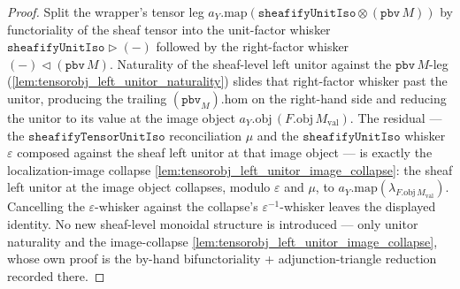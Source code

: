 \begin{proof}
  \leanok
  Split the wrapper's tensor leg \(a_Y.\mathrm{map}(\mathtt{sheafifyUnitIso} \otimes (\mathtt{pbv}\,M))\)
  by functoriality of the sheaf tensor into the unit-factor whisker
  \(\mathtt{sheafifyUnitIso} \rhd (-)\) followed by the right-factor whisker
  \((-) \lhd (\mathtt{pbv}\,M)\). Naturality of the sheaf-level left unitor against the
  \(\mathtt{pbv}\,M\)-leg (\cref{lem:tensorobj_left_unitor_naturality}) slides that right-factor whisker
  past the unitor, producing the trailing \((\mathtt{pbv}_{M}).\mathrm{hom}\) on the right-hand side and
  reducing the unitor to its value at the image object
  \(a_Y.\mathrm{obj}\,(F.\mathrm{obj}\,M_{\mathrm{val}})\). The residual --- the
  \(\mathtt{sheafifyTensorUnitIso}\) reconciliation \(\mu\) and the \(\mathtt{sheafifyUnitIso}\)
  whisker \(\varepsilon\) composed against the sheaf left unitor at that image object --- is exactly the
  localization-image collapse \cref{lem:tensorobj_left_unitor_image_collapse}: the sheaf left unitor at
  the image object collapses, modulo \(\varepsilon\) and \(\mu\), to
  \(a_Y.\mathrm{map}(\lambda_{F.\mathrm{obj}\,M_{\mathrm{val}}})\). Cancelling the
  \(\varepsilon\)-whisker against the collapse's \(\varepsilon^{-1}\)-whisker leaves the displayed
  identity. No new sheaf-level monoidal structure is introduced --- only unitor naturality and the
  image-collapse \cref{lem:tensorobj_left_unitor_image_collapse}, whose own proof is the by-hand
  bifunctoriality + adjunction-triangle reduction recorded there.
\end{proof}

